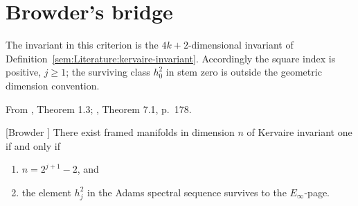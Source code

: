 \section{Browder's bridge}
The invariant in this criterion is the $4k+2$-dimensional invariant of
Definition~\ref{sem:Literature:kervaire-invariant}. Accordingly the square
index is positive, $j\geq1$; the surviving class $h_0^2$ in stem zero is
outside the geometric dimension convention.
\begin{theorem}
\label{paper:1.3}
From \cite{LWX126}, Theorem 1.3; \cite{Browder}, Theorem 7.1, p.~178.\par
[Browder \cite{Browder}] \label{thm:browder}
   There exist framed manifolds in dimension $n$ of Kervaire invariant one if and only if
   \begin{enumerate}
       \item $n=2^{j+1}-2$, and
       \item the element $h_j^2$ in the Adams spectral sequence survives to the $E_\infty$-page.
   \end{enumerate}


\end{theorem}
